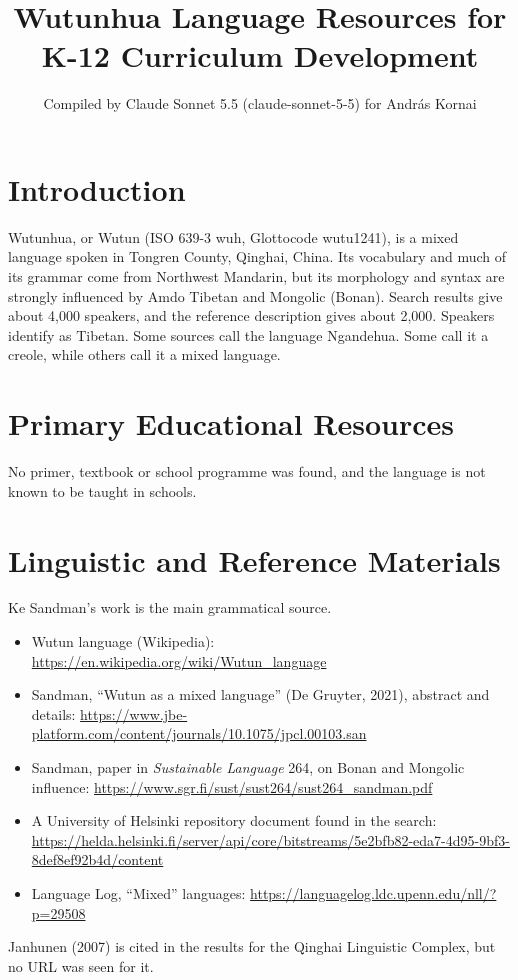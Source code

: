 \documentclass[12pt]{article}
\title{Wutunhua Language Resources for K-12 Curriculum Development}
\author{Compiled by Claude Sonnet 5.5 (claude-sonnet-5-5) for Andr\'as Kornai}
\date{}
\begin{document}
\maketitle

\section{Introduction}
Wutunhua, or Wutun (ISO 639-3 wuh, Glottocode wutu1241), is a mixed language spoken in Tongren County, Qinghai, China. Its vocabulary and much of its grammar come from Northwest Mandarin, but its morphology and syntax are strongly influenced by Amdo Tibetan and Mongolic (Bonan). Search results give about 4,000 speakers, and the reference description gives about 2,000. Speakers identify as Tibetan. Some sources call the language Ngandehua. Some call it a creole, while others call it a mixed language.

\section{Primary Educational Resources}
No primer, textbook or school programme was found, and the language is not known to be taught in schools.

\section{Linguistic and Reference Materials}
Ke Sandman's work is the main grammatical source.
\begin{itemize}
\item Wutun language (Wikipedia): \url{https://en.wikipedia.org/wiki/Wutun_language}
\item Sandman, ``Wutun as a mixed language'' (De Gruyter, 2021), abstract and details: \url{https://www.jbe-platform.com/content/journals/10.1075/jpcl.00103.san}
\item Sandman, paper in \emph{Sustainable Language} 264, on Bonan and Mongolic influence: \url{https://www.sgr.fi/sust/sust264/sust264_sandman.pdf}
\item A University of Helsinki repository document found in the search: \url{https://helda.helsinki.fi/server/api/core/bitstreams/5e2bfb82-eda7-4d95-9bf3-8def8ef92b4d/content}
\item Language Log, ``Mixed'' languages: \url{https://languagelog.ldc.upenn.edu/nll/?p=29508}
\end{itemize}
Janhunen (2007) is cited in the results for the Qinghai Linguistic Complex, but no URL was seen for it.
\end{document}
